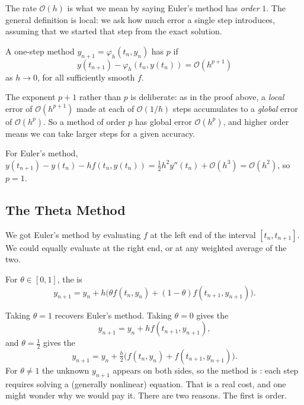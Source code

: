 The rate $\mathcal{O}(h)$ is what we mean by saying Euler's method has \emph{order} $1$. The general definition is local: we ask how much error a single step introduces, assuming that we started that step from the exact solution.

\begin{definition}[Order]
  A one-step method $y_{n+1} = \varphi_h(t_n, y_n)$ has  $p$ if
  $$
  y(t_{n+1}) - \varphi_h(t_n, y(t_n)) = \mathcal{O}(h^{p+1})
  $$
  as $h \to 0$, for all sufficiently smooth $f$.
\end{definition}

The exponent $p+1$ rather than $p$ is deliberate: as in the proof above, a \emph{local} error of $\mathcal{O}(h^{p+1})$ made at each of $\mathcal{O}(1/h)$ steps accumulates to a \emph{global} error of $\mathcal{O}(h^p)$. So a method of order $p$ has global error $\mathcal{O}(h^p)$, and higher order means we can take larger steps for a given accuracy.

\begin{example}
  For Euler's method, $y(t_{n+1}) - y(t_n) - hf(t_n,y(t_n)) = \tfrac12 h^2 y''(t_n) + \mathcal{O}(h^3) = \mathcal{O}(h^2)$, so $p = 1$.
\end{example}

\subsection{The Theta Method}

We got Euler's method by evaluating $f$ at the left end of the interval $[t_n, t_{n+1}]$. We could equally evaluate at the right end, or at any weighted average of the two.

\begin{definition}
  For $\theta \in [0,1]$, the  is
  $$
  y_{n+1} = y_n + h\Big(\theta f(t_n, y_n) + (1-\theta)f(t_{n+1}, y_{n+1})\Big).
  $$
\end{definition}

Taking $\theta = 1$ recovers Euler's method. Taking $\theta = 0$ gives the 
$$
y_{n+1} = y_n + hf(t_{n+1}, y_{n+1}),
$$
and $\theta = \tfrac12$ gives the 
$$
y_{n+1} = y_n + \tfrac{h}{2}\big(f(t_n,y_n) + f(t_{n+1},y_{n+1})\big).
$$
For $\theta \neq 1$ the unknown $y_{n+1}$ appears on both sides, so the method is : each step requires solving a (generally nonlinear) equation. That is a real cost, and one might wonder why we would pay it. There are two reasons. The first is order.

